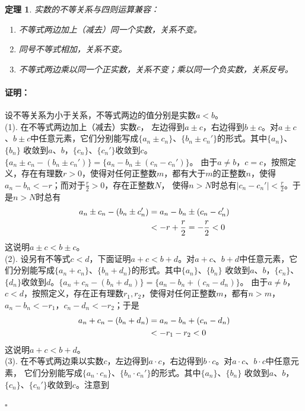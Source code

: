 \documentclass[12pt,UTF8]{ctexbook}
\newtheorem{tm}{定理}[section]
\newenvironment{proof2}{\paragraph{\textbf{证明：}}}{\hfill$\square$}
\begin{document}
\begin{appendix}
\begin{tm}\label{tm:a-1-30}
    实数的不等关系与四则运算兼容：
    \begin{enumerate}
        \item 不等式两边加上（减去）同一个实数，关系不变。
        \item 同号不等式相加，关系不变。
        \item 不等式两边乘以同一个正实数，关系不变；乘以同一个负实数，关系反号。
    \end{enumerate}
\end{tm}
\begin{proof2}
    设不等关系为小于关系，不等式两边的值分别是实数$a<b$。\\
    (1). 在不等式两边加上（减去）实数$c$，
    左边得到$a\pm c$，右边得到$b\pm c$。对$a\pm c$、$b\pm c$中任意元素，它们分别能写成$\{a_n\pm c_n\}$、$\{b_n\pm c_n'\}$的形式。其中$\{a_n\}$、$\{b_n\}$
    收敛到$a$、$b$，$\{c_n\}$、$\{c_n'\}$收敛到$c$。$\{a_n\pm c_n-(b_n\pm c_n')\} = \{a_n - b_n \pm  (c_n - c_n')\}$。
    由于$a\neq b$，$c = c$，按照定义，存在有理数$r>0$，使得对任何正整数$m$，都有大于$m$的正整数$n$，使得$a_n - b_n < -r$；而对于$\frac{r}{2}>0$，存在正整数$N$，
    使得$n>N$时总有$|c_n - c_n'| < \frac{r}{2}$。于是$n>N$时总有
    \begin{align}
        a_n\pm c_n-(b_n\pm c_n') &= a_n - b_n \pm  (c_n - c_n') \notag \\
        &< -r + \frac{r}{2} = -\frac{r}{2} < 0 \notag
    \end{align}
    这说明$a\pm c < b\pm c$。\\
    (2). 设另有不等式$c<d$，下面证明$a + c < b + d$。对$a + c$、$b + d$中任意元素，它们分别能写成$\{a_n + c_n\}$、$\{b_n + d_n\}$的形式。其中$\{a_n\}$、$\{b_n\}$
    收敛到$a$、$b$，$\{c_n\}$、$\{d_n\}$收敛到$d$。$\{a_n + c_n-(b_n + d_n)\} = \{a_n - b_n + (c_n - d_n)\}$。
    由于$a\neq b$，$c < d$，按照定义，存在正有理数$r_1,r_2$，使得对任何正整数$m$，都有$n>m$，$a_n - b_n < -r_1$，$c_n - d_n < -r_2$；于是
    \begin{align}
        a_n + c_n-(b_n + d_n) &= a_n - b_n +  (c_n - d_n) \notag \\
        &< -r_1 - r_2 < 0 \notag
    \end{align}
    这说明$a + c < b + d$。\\
    (3). 在不等式两边乘以实数$c$，左边得到$a\cdot c$，右边得到$b\cdot c$。对$a\cdot c$、$b\cdot c$中任意元素，
    它们分别能写成$\{a_n\cdot c_n\}$、$\{b_n\cdot c_n'\}$的形式。其中$\{a_n\}$、$\{b_n\}$
    收敛到$a$、$b$，$\{c_n\}$、$\{c_n'\}$收敛到$c$。注意到

\end{proof2}
\end{appendix}
\end{document}
